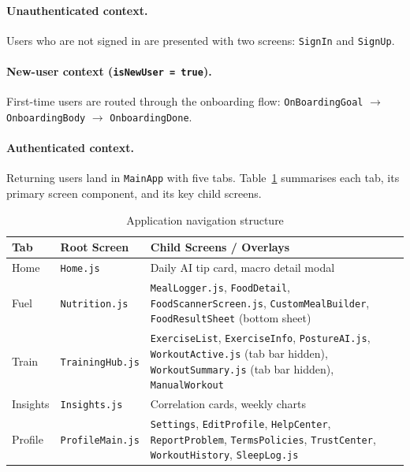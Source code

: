 \paragraph{Unauthenticated context.}
Users who are not signed in are presented with two screens:
\texttt{SignIn} and \texttt{SignUp}.

\paragraph{New-user context (\texttt{isNewUser = true}).}
First-time users are routed through the onboarding flow:
\texttt{OnBoardingGoal} $\to$ \texttt{OnboardingBody} $\to$
\texttt{OnboardingDone}.

\paragraph{Authenticated context.}
Returning users land in \texttt{MainApp} with five tabs.
Table~\ref{tab:navigation} summarises each tab, its primary screen
component, and its key child screens.

\begin{table}[H]
	\centering
	\caption{Application navigation structure}
	\label{tab:navigation}
	\begin{tabularx}{\textwidth}{llX}
		\toprule
		\textbf{Tab} & \textbf{Root Screen} & \textbf{Child Screens / Overlays} \\
		\midrule
		Home      & \texttt{Home.js}
		& Daily AI tip card, macro detail modal \\
		Fuel      & \texttt{Nutrition.js}
		& \texttt{MealLogger.js}, \texttt{FoodDetail},
		\texttt{FoodScannerScreen.js},
		\texttt{CustomMealBuilder},
		\texttt{FoodResultSheet} (bottom sheet) \\
		Train     & \texttt{TrainingHub.js}
		& \texttt{ExerciseList}, \texttt{ExerciseInfo},
		\texttt{PostureAI.js},
		\texttt{WorkoutActive.js} (tab bar hidden),
		\texttt{WorkoutSummary.js} (tab bar hidden),
		\texttt{ManualWorkout} \\
		Insights  & \texttt{Insights.js}
		& Correlation cards, weekly charts \\
		Profile   & \texttt{ProfileMain.js}
		& \texttt{Settings}, \texttt{EditProfile},
		\texttt{HelpCenter}, \texttt{ReportProblem},
		\texttt{TermsPolicies}, \texttt{TrustCenter},
		\texttt{WorkoutHistory}, \texttt{SleepLog.js} \\
		\bottomrule
	\end{tabularx}
\end{table}

